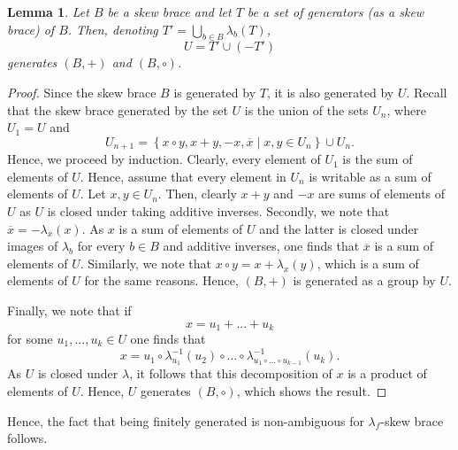 \documentclass{amsart}
\newtheorem{lem}[thm]{Lemma}
\begin{document}
\begin{lem}
\label{gens}
    Let $B$ be a skew brace and let $T$ be a set of generators (as a skew brace) of $B$.
    Then, denoting $T'=\bigcup_{b\in B}\lambda_b(T)$,
    \[
    U=T' \cup (-T')
    \] 
    generates $(B,+)$ and $(B,\circ)$.
\end{lem}
\begin{proof}
Since the skew brace $B$ is generated by $T$, it is also generated by $U$.
Recall that the skew brace generated by the set $U$ is the union of the sets $U_n$,
where $U_1=U$ and
\[
 U_{n+1} 
 = \left\lbrace x\circ y, x+y, -x, \overline{x} \mid x,y \in U_n \right\rbrace \cup U_n.
 \]
 Hence, we proceed by induction.
 Clearly, every element of $U_1$ is the sum of elements of $U$. 
 Hence, assume that every element in $U_{n}$ is writable as a sum of elements of $U$.
 Let $x,y \in U_n$. 
 Then, clearly $x+y$ and $-x$ are sums of elements of $U$ 
 as $U$ is closed under taking additive inverses.
 Secondly, we note that $\overline{x}=-\lambda_{\overline{x}}(x)$. 
 As $x$ is a sum of elements of $U$ and the latter
 is closed under images of $\lambda_b$ for every $b\in B$ and additive inverses,
 one finds that $\overline{x}$ is a sum of elements of $U$.
 Similarly, we note that $x \circ y = x +\lambda_x(y)$,
 which is a sum of elements of $U$ for the same reasons.
 Hence, $(B,+)$ is generated as a group by $U$.
    
Finally, we note that if $$ x= u_1+ ... +u_k$$ for some $u_1,...,u_k \in U$
one finds that 
\[
x = u_1 \circ \lambda_{u_1}^{-1}(u_2)\circ ... \circ \lambda_{u_1\circ ... \circ u_{k-1}}^{-1}(u_k).
\]
As $U$ is closed under $\lambda$, it follows that 
this decomposition of $x$ is a product of elements of $U$. 
Hence, $U$ generates $(B,\circ)$, which shows the result.
\end{proof}

Hence, the fact that being finitely generated is non-ambiguous for $\lambda_f$-skew brace follows.
\end{document}
